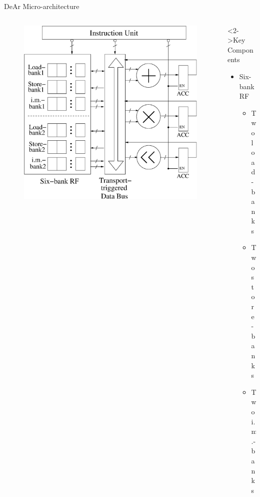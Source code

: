 \documentclass[handout]{beamer}
\begin{document}
\begin{CJK}{UTF8}{bkai}
            \begin{frame}{DeAr Micro-architecture}
                \begin{columns}
                    \begin{column}{0.6\textwidth}
                        \begin{figure}[!ht] 
                            \centering
                            \includegraphics[width=1.0\textwidth]{./figs/_micro.eps}
                        \end{figure}
                    \end{column}
                    \begin{column}{0.35\textwidth}
                        \begin{block}<2->{Key Components}
                            \begin{itemize}
                                \item <3->
                                {
                                    Six-bank RF
                                    \begin{itemize}
                                        \item Two load-banks
                                        \item Two store-banks
                                        \item Two i.m.-banks

\end{itemize}}
\end{itemize}
\end{block}
\end{column}
\end{columns}
\end{frame}
\end{CJK}
\end{document}
